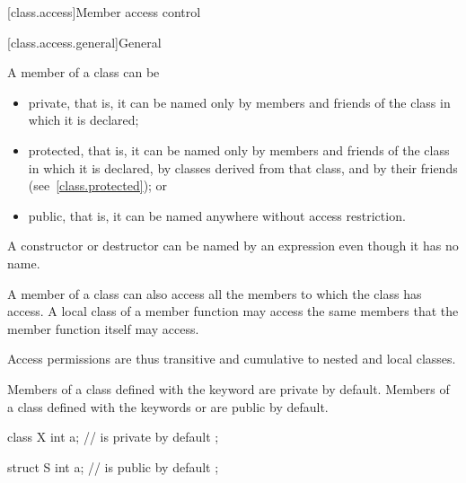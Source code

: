 [class.access]{Member access control}%

[class.access.general]{General}%


\pnum
A member of a class can be
\begin{itemize}
\item
{}%
private,
that is, it can be named only by members and friends
of the class in which it is declared;
\item
{}%
protected,
that is, it can be named only by members and friends
of the class in which it is declared, by classes derived from that class, and by their
friends (see~\ref{class.protected}); or
\item
{}%
public,
that is, it can be named anywhere without access restriction.
\end{itemize}
\begin{note}
A constructor or destructor can be named by an expression
even though it has no name.
\end{note}

\pnum
A member of a class can also access all the members to which the class has access.
A local class of a member function may access
the same members that the member function itself may access.
\begin{footnote}
Access
permissions are thus transitive and cumulative to nested
and local classes.
\end{footnote}

\pnum
{}%
%
%
Members of a class defined with the keyword
are private by default.
Members of a class defined with the keywords
 or 
are public by default.
\begin{example}
\begin{codeblock}
class X {
  int a;            //  is private by default
};

struct S {
  int a;            //  is public by default
};
\end{codeblock}
\end{example}

